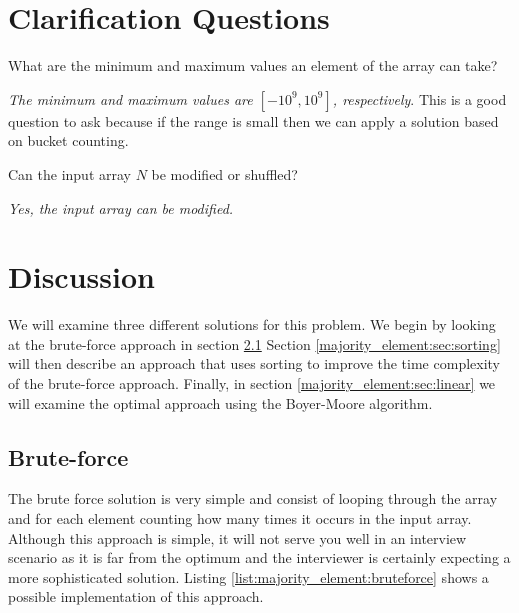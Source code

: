 \section{Clarification Questions}

\begin{QandA}
	\begin{questionitem} \begin{question} What are the minimum and maximum values an element of the array can take?   \end{question} 	 
    \begin{answered}
		\textit{The minimum and maximum values are $[-10^9, 10^9]$, respectively}.
		This is a good question to ask because if the range is small then we can apply a solution based on bucket counting.
	\end{answered} \end{questionitem}

	\begin{questionitem} \begin{question} Can the input array $N$ be modified or shuffled?   \end{question} 	 
    \begin{answered}
		\textit{Yes, the input array can be modified.}
	\end{answered} \end{questionitem}
\end{QandA}

\section{Discussion}
\label{majority_element:sec:discussion}
We will examine three different solutions for this problem. We begin  by looking at the brute-force approach in section \ref{majority_element:sec:bruteforce} Section \ref{majority_element:sec:sorting} will then describe an approach that uses sorting to improve the time complexity of the brute-force approach. Finally,  in section \ref{majority_element:sec:linear} we will examine the optimal approach using the Boyer-Moore algorithm.

\subsection{Brute-force}
\label{majority_element:sec:bruteforce}
The brute force solution is very simple and consist of looping through the array and for each element counting how many times it occurs in the input array. Although this approach is simple, it will not serve you well in an interview scenario as it is far from the optimum and the interviewer is certainly expecting a more sophisticated solution. 
Listing \ref{list:majority_element:bruteforce} shows a possible implementation of this approach. 

